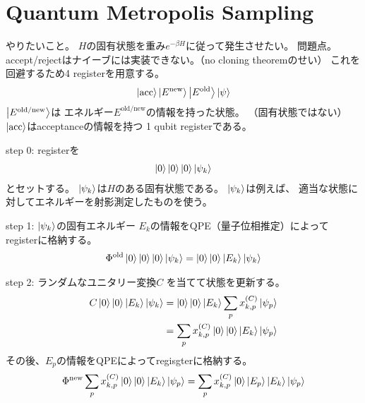 \documentclass[]{ltjsarticle}
\begin{document}
\section{Quantum Metropolis Sampling}
やりたいこと。
$H$の固有状態を重み$e^{-\beta H}$に従って発生させたい。
問題点。accept/rejectはナイーブには実装できない。（no cloning theoremのせい）
これを回避するため4 registerを用意する。
\begin{align}
    \ket{\text{acc}}
    \ket{E^\text{new}}
    \ket{E^\text{old}}
    \ket{\psi}
\end{align}
$\ket{E^\text{old/new}}$は
エネルギー$E^\text{old/new}$の情報を持った状態。
（固有状態ではない）
$\ket{\text{acc}}$はacceptanceの情報を持つ
1 qubit registerである。


step 0:
registerを
\begin{align}
    \ket{0}
    \ket{0}
    \ket{0}
    \ket{\psi_k}
\end{align}
とセットする。
$\ket{\psi_k}$は$H$のある固有状態である。
$\ket{\psi_k}$は例えば、
適当な状態に対してエネルギーを射影測定したものを使う。

step 1:
$\ket{\psi_k}$の固有エネルギー
$E_k$の情報をQPE（量子位相推定）によって
registerに格納する。
\begin{align}
    \Phi^\text{old}
    \ket{0}
    \ket{0}
    \ket{0}
    \ket{\psi_k}
    =
    \ket{0}
    \ket{0}
    \ket{E_k}
    \ket{\psi_k}
\end{align}

step 2:
ランダムなユニタリー変換$C$
を当てて状態を更新する。
\begin{align}
    C
    \ket{0}
    \ket{0}
    \ket{E_k}
    \ket{\psi_k}
    &=
    \ket{0}
    \ket{0}
    \ket{E_k}
    \sum_p x_{k,p}^{(C)}
    \ket{\psi_p} \\
    &=
    \sum_p x_{k,p}^{(C)}
    \ket{0}
    \ket{0}
    \ket{E_k}
    \ket{\psi_p}
\end{align}
その後、$E_p$の情報をQPEによってregisgterに格納する。
\begin{align}
    \Phi^\text{new}
    \sum_p x_{k,p}^{(C)}
    \ket{0}
    \ket{0}
    \ket{E_k}
    \ket{\psi_p}
    =
    \sum_p x_{k,p}^{(C)}
    \ket{0}
    \ket{E_p}
    \ket{E_k}
    \ket{\psi_p}
\end{align}
\end{document}
